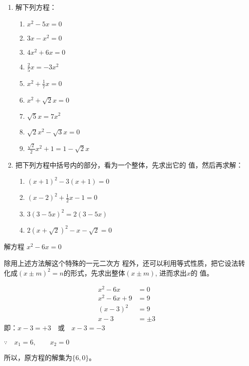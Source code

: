 \begin{ex}
\begin{enumerate}
    \item 解下列方程：
\begin{multicols}{2}
    \begin{enumerate}
    \item $x^{2}-5 x=0$
    \item $3 x-x^{2}=0$
    \item $4 x^{2}+6 x=0$
    \item $\frac{2}{5} x=-3 x^{2}$
    \item $x^{2}+\frac{1}{7} x=0$
    \item $x^{2}+\sqrt{2} x=0$
    \item $\sqrt{5} x=7 x^{2}$
    \item  $\sqrt{2} x^{2}-\sqrt{3} x=0$
    \item $\frac{\sqrt{2}}{2} x^{2}+1=1-\sqrt{2} x$
\end{enumerate}
\end{multicols}
\item 把下列方程中括号内的部分，看为一个整体，先求出它的
值，然后再求解：
\begin{multicols}{2}
\begin{enumerate}
    \item $(x+1)^{2}-3(x+1)=0$
    \item $(x-2)^{2}+\frac{1}{2} x-1=0$
    \item $3(3-5 x)^{2}=2(3-5 x)$
    \item $2(x+\sqrt{2})^{2}-x-\sqrt{2}=0$
\end{enumerate}
\end{multicols}
\end{enumerate}
\end{ex}

\begin{example}
解方程 $x^2-6x=0$
\end{example}

\begin{analyze}
    除用上述方法解这个特殊的一元二次方
程外，还可以利用等式性质，把它设法转化成$(x\pm 
m)^2=n$的形式，先求出整体$(x\pm m)$, 进而求出$x$的
值。
\end{analyze}

\begin{solution}
\begin{align*}
    x^2-6x&=0\\
    x^2-6x+9&=9 \tag{两边加上9}\\
    (x-3)^2&=9\\
    x-3&=\pm 3  \tag{平方根的意义}
\end{align*}    
即：$x-3=+3\quad \text{或}\quad x-3=-3$

$\because\quad x_1=6,\qquad x_2=0$

所以，原方程的解集为$\{6,0\}$。
\end{solution}

